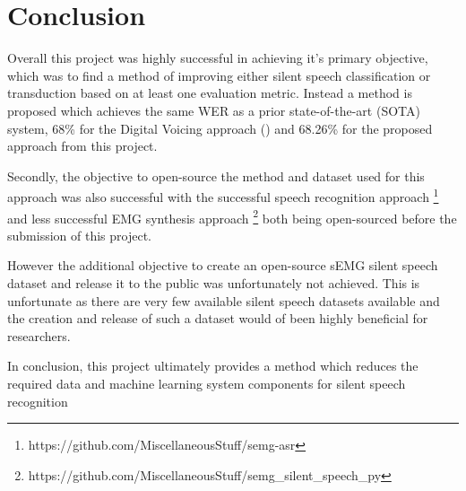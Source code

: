 \chapter{Conclusion} \label{chap:conclusion}

Overall this project was highly successful in achieving it's primary objective,
which was to find a method of improving either silent speech classification
or transduction based on at least one evaluation metric. Instead a method is
proposed which achieves the same WER as a prior state-of-the-art (SOTA)
system, 68\% for the Digital Voicing approach (\cite{gaddy2020digital})
and 68.26\% for the proposed approach from this project.

Secondly, the objective to open-source the method and dataset used for
this approach was also successful with the successful
speech recognition approach
\footnote{https://github.com/MiscellaneousStuff/semg-asr}
and less successful EMG synthesis approach
\footnote{https://github.com/MiscellaneousStuff/semg\_silent\_speech\_py}
both being open-sourced before the submission of this project.

However the additional objective to create an open-source sEMG silent
speech dataset and release it to the public was unfortunately not achieved.
This is unfortunate as there are very few available silent speech datasets
available and the creation and release of such a dataset would of been
highly beneficial for researchers.

In conclusion, this project ultimately provides a method which reduces
the required data and machine learning system components for silent
speech recognition